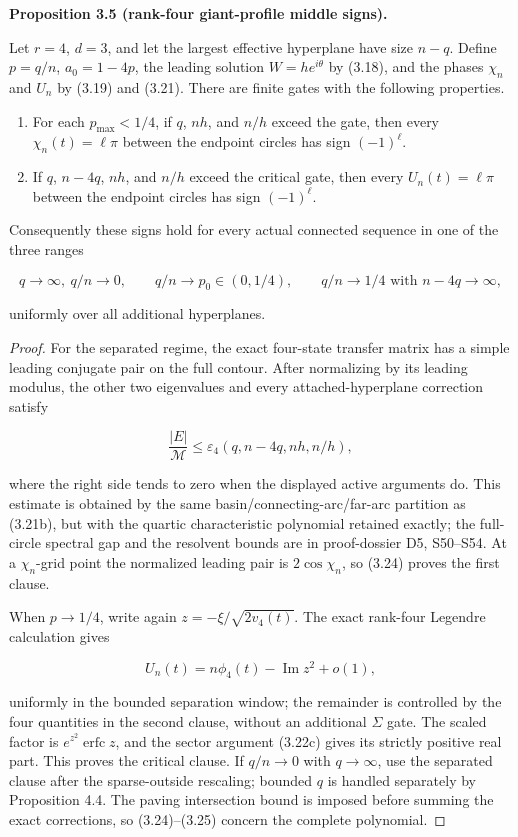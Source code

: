 \documentclass[10pt]{article}
\newenvironment{mdstatement}[1]
  {\par\Needspace{0.16\textheight}\noindent\textbf{#1.}\ \itshape}
  {\par\normalfont}
\begin{document}
\begin{mdstatement}{Proposition 3.5 (rank-four giant-profile middle signs)}


Let $r=4$, $d=3$, and let the largest effective hyperplane have size
$n-q$.  Define $p=q/n$, $a_0=1-4p$, the leading solution
$W=h e^{i\theta}$ by (3.18), and the phases $\chi_n$ and $U_n$ by
(3.19) and (3.21).  There are finite gates with the following properties.

\begin{enumerate}
\item For each $p_{\max}<1/4$, if $q$, $nh$, and $n/h$ exceed the gate,
then every $\chi_n(t)=\ell\pi$ between the endpoint circles has sign
$(-1)^\ell$.
\item If $q$, $n-4q$, $nh$, and $n/h$ exceed the critical gate, then
every $U_n(t)=\ell\pi$ between the endpoint circles has sign
$(-1)^\ell$.
\end{enumerate}

Consequently these signs hold for every actual connected sequence in one of
the three ranges

\[
 q\to\infty,\ q/n\to0,\qquad q/n\to p_0\in(0,1/4),\qquad
 q/n\to1/4\text{ with }n-4q\to\infty, \tag{3.23}
\]

uniformly over all additional hyperplanes.

\end{mdstatement}

\begin{proof}


For the separated regime, the exact four-state transfer matrix has a simple
leading conjugate pair on the full contour.  After normalizing by its leading
modulus, the other two eigenvalues and every attached-hyperplane correction
satisfy

\[
 \frac{|E|}{\mathcal M}
 \le \varepsilon_4(q,n-4q,nh,n/h), \tag{3.24}
\]

where the right side tends to zero when the displayed active arguments do.
This estimate is obtained by the same basin/connecting-arc/far-arc partition
as (3.21b), but with the quartic characteristic polynomial retained exactly;
the full-circle spectral gap and the resolvent bounds are in proof-dossier D5,
S50--S54.  At a $\chi_n$-grid point the normalized leading pair is
$2\cos\chi_n$, so (3.24) proves the first clause.

When $p\to1/4$, write again
$z=-\xi/\sqrt{2v_4(t)}$.  The exact rank-four Legendre calculation gives

\[
 U_n(t)=n\phi_4(t)-\operatorname{Im}z^2+o(1), \tag{3.25}
\]

uniformly in the bounded separation window; the remainder is controlled by
the four quantities in the second clause, without an additional $\Sigma$
gate.  The scaled factor is $e^{z^2}\operatorname{erfc}z$, and the sector
argument (3.22c) gives its strictly positive real part.  This proves the
critical clause.  If $q/n\to0$ with $q\to\infty$, use the separated
clause after the sparse-outside rescaling; bounded $q$ is handled separately
by Proposition 4.4.  The paving intersection bound is imposed before summing
the exact corrections, so (3.24)--(3.25) concern the complete polynomial.

\end{proof}
\end{document}
